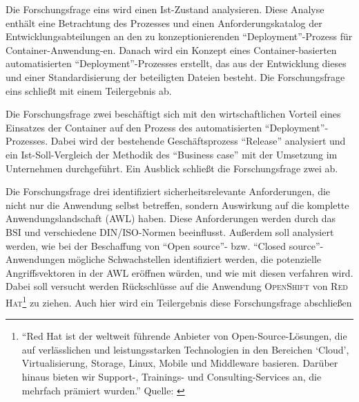 Die Forschungsfrage eins wird einen Ist-Zustand analysieren. Diese Analyse enthält eine Betrachtung des Prozesses und einen Anforderungskatalog der Entwicklungsabteilungen an den zu konzeptionierenden \enquote{Deployment}-Prozess für Container-Anwendung-en. Danach wird ein Konzept eines Container-basierten automatisierten \enquote{Deployment}-Prozesses erstellt, das aus der Entwicklung dieses und einer Standardisierung der beteiligten Dateien besteht. Die Forschungsfrage eins schließt mit einem Teilergebnis ab. \par
Die Forschungsfrage zwei beschäftigt sich mit den wirtschaftlichen Vorteil eines Einsatzes der Container auf den Prozess des automatisierten \enquote{Deployment}-Prozesses. Dabei wird der bestehende Geschäftsprozess \enquote{Release} analysiert und ein Ist-Soll-Vergleich der Methodik des \enquote{Business case} mit der Umsetzung im Unternehmen durchgeführt. Ein Ausblick schließt die Forschungsfrage zwei ab. 
\par
Die Forschungsfrage drei identifiziert sicherheitsrelevante Anforderungen, die nicht nur die Anwendung selbst betreffen, sondern Auswirkung auf die komplette Anwendungslandschaft (\acs{AWL}) haben. Diese Anforderungen werden durch das \acl{BSI} und verschiedene \textsc{DIN/ISO}-Normen beeinflusst. Außerdem soll analysiert werden, wie bei der Beschaffung von \enquote{Open source}- bzw. \enquote{Closed source}-Anwendungen mögliche Schwachstellen identifiziert werden, die potenzielle Angriffsvektoren in der \ac{AWL} eröffnen würden, und wie mit diesen verfahren wird. Dabei soll versucht werden Rückschlüsse auf die Anwendung \textsc{OpenShift} von \textsc{Red Hat\footnote{\enquote{Red Hat ist der weltweit führende Anbieter von Open-Source-Lösungen, die auf verlässlichen und leistungsstarken Technologien in den Bereichen \enquote{Cloud}, Virtualisierung, Storage, Linux, Mobile und Middleware basieren. Darüber hinaus bieten wir Support-, Trainings- und Consulting-Services an, die mehrfach prämiert wurden.} Quelle: \cite[][]{red_hat_inc_red_2020}}} zu ziehen. Auch hier wird ein Teilergebnis diese Forschungsfrage abschließen


